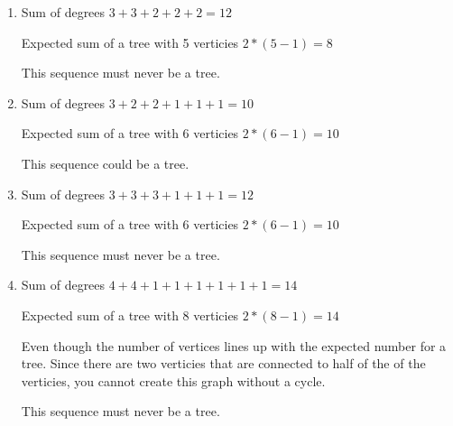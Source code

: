 \documentclass{article}
\begin{document}
\begin{enumerate}[label= (\alph*)]
    \item 
    Sum of degrees $3+3+2+2+2=12$

    Expected sum of a tree with 5 verticies $2*(5-1)=8$

    This sequence must never be a tree.
    \item
    Sum of degrees $3+2+2+1+1+1=10$

    Expected sum of a tree with 6 verticies $2*(6-1)=10$

    This sequence could be a tree.


    \item
    Sum of degrees $3+3+3+1+1+1=12$

    Expected sum of a tree with 6 verticies $2*(6-1)=10$

    This sequence must never be a tree.

    \item
    Sum of degrees $4+4+1+1+1+1+1+1=14$

    Expected sum of a tree with 8 verticies $2*(8-1)=14$

    Even though the number of vertices lines up with the expected number for a tree. Since there are two verticies that are connected to half of the of the verticies, you cannot create this graph without a cycle.

    This sequence must never be a tree.
    \end{enumerate}

\end{document}
